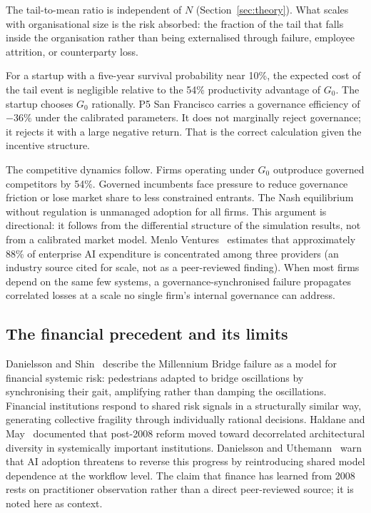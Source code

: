 \documentclass[11pt,a4paper]{article}
\begin{document}
The tail-to-mean ratio is independent of $N$
(Section~\ref{sec:theory}). What scales with organisational size is the risk
absorbed: the fraction of the tail that falls inside the organisation rather
than being externalised through failure, employee attrition, or counterparty
loss.

For a startup with a five-year survival probability near 10\%, the expected
cost of the tail event is negligible relative to the 54\% productivity
advantage of $G_0$. The startup chooses $G_0$ rationally. P5 San Francisco
carries a governance efficiency of $-36\%$ under the calibrated
parameters. It does not marginally reject governance; it rejects it with a
large negative return. That is the correct calculation given the incentive
structure.

The competitive dynamics follow. Firms operating under $G_0$ outproduce
governed competitors by 54\%. Governed incumbents face pressure to reduce
governance friction or lose market share to less constrained entrants. The
Nash equilibrium without regulation is unmanaged adoption for all firms.
This argument is directional: it follows from the differential structure of
the simulation results, not from a calibrated market
model. Menlo Ventures~\cite{menlo_2025} estimates that approximately 88\%
of enterprise AI expenditure is concentrated among three providers (an
industry source cited for scale, not as a peer-reviewed finding). When most
firms depend on the same few systems, a governance-synchronised failure
propagates correlated losses at a scale no single firm's internal governance
can address.

\subsection{The financial precedent and its limits}

Danielsson and Shin~\cite{danielsson_endogenous_2012} describe the
Millennium Bridge failure as a model for financial systemic risk:
pedestrians adapted to bridge oscillations by synchronising their gait,
amplifying rather than damping the oscillations. Financial institutions
respond to shared risk signals in a structurally similar way, generating
collective fragility through individually rational decisions. Haldane and
May~\cite{haldane_nature_2011} documented that post-2008 reform moved
toward decorrelated architectural diversity in systemically important
institutions. Danielsson and Uthemann~\cite{danielsson_jfs_2025} warn that
AI adoption threatens to reverse this progress by reintroducing shared model
dependence at the workflow level. The claim that finance has learned from
2008 rests on practitioner observation rather than a direct peer-reviewed
source; it is noted here as context.
\end{document}

